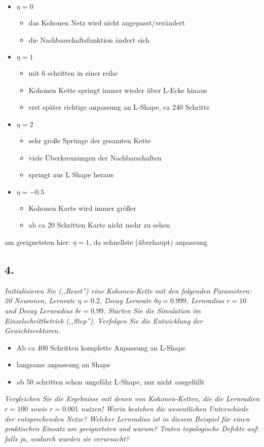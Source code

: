 \documentclass[a4paper,10pt,titlepage]{scrartcl}
\begin{document}
\begin{itemize}
    \item $\eta=0$
          \begin{itemize}
              \item das Kohonen Netz wird nicht angepasst/verändert
              \item die Nachbarschaftsfunktion ändert sich
          \end{itemize}
    \item $\eta=1$
          \begin{itemize}
              \item mit 6 schritten in einer reihe
              \item Kohonen Kette springt immer wieder über L-Ecke hinaus
              \item erst später richtige anpassung an L-Shape, ca 240 Schritte
          \end{itemize}
    \item $\eta=2$
          \begin{itemize}
              \item sehr große Sprünge der gesamten Kette
              \item viele Überkreuzungen der Nachbarschaften
              \item springt aus L Shape heraus
          \end{itemize}
    \item $\eta=-0.5$
          \begin{itemize}
              \item Kohonen Karte wird immer größer
              \item ab ca 20 Schritten Karte nicht mehr zu sehen
          \end{itemize}
\end{itemize}

am geeignetsten hier: $\eta=1$, da schnellste (überhaupt) anpassung

\subsection*{4.}
\textit{Initialisieren Sie (,,Reset'') eine Kohonen-Kette mit den folgenden Parametern: 20 Neuronen, Lernrate $\eta=0.2$, Decay Lernrate $\delta\eta=0.999$, Lernradius $r=10$ und Decay Lernradius $\delta r=0.99$. Starten Sie die Simulation im Einzelschrittbetrieb (,,Step''). Verfolgen Sie die Entwicklung der Gewichtsvektoren.}
\begin{itemize}
    \item Ab ca 400 Schritten komplette Anpassung an L-Shape
    \item langsame anpassung an Shape
    \item ab 50 schritten schon ungefähr L-Shape, nur nicht ausgefüllt
\end{itemize}
\textit{Vergleichen Sie die Ergebnisse mit denen von Kohonen-Ketten, die die Lernradien $r=100$ sowie $r=0.001$ nutzen! Worin bestehen die wesentlichen Unterschiede der entsprechenden Netze? Welcher Lernradius ist in diesem Beispiel für einen praktischen Einsatz am geeignetsten und warum? Traten topologische Defekte auf: falls ja, wodurch wurden sie verursacht?}
\end{document}

